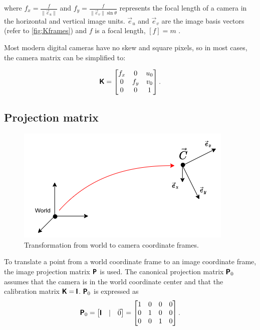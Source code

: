 where $f_x = \frac{f}{\lVert \vec{e}_u \rVert} $ and $f_y = \frac{f}{\lVert \vec{e}_v \rVert \sin{\theta}}$ represents the focal length of a camera in the horizontal and vertical image units.
$\vec{e}_u$ and $\vec{e}_v$ are the image basis vectors (refer to \autoref{fig:Kframes}) and $f$ is a focal length, $[f] = m$ .

Most modern digital cameras have no skew and square pixels, so in most cases, the camera matrix can be simplified to:

\begin{equation}
    \label{eq:kmat}
    \pmb{\mathsf{K}} = \begin{bmatrix}
        f_x & 0 & u_0 \\
        0 & f_y & v_0 \\
        0 & 0 & 1 \\
    \end{bmatrix}.
\end{equation}

\subsection{Projection matrix}

\begin{figure}[ht]
    \centering
    \includegraphics[width=.5\textwidth]{graphics/frames.png}
    \caption{Transformation from world to camera coordinate frames.}
    \label{fig:frames}
\end{figure}

To translate a point from a world coordinate frame to an image coordinate frame, the image projection matrix $\pmb{\mathsf{P}}$ is used. 
The canonical projection matrix $\pmb{\mathsf{P}}_0$ assumes that the camera is in the world coordinate center and that the calibration matrix $\pmb{\mathsf{K}} = \pmb{\mathsf{I}}$.
$\pmb{\mathsf{P}}_0$ is expressed as
\begin{equation}
\pmb{\mathsf{P}}_0 = \begin{bmatrix} \pmb{\mathsf{I}} & | & \vec{0} \end{bmatrix} = 
    \begin{bmatrix}
    1 & 0 & 0 & 0 \\
    0 & 1 & 0 & 0 \\
    0 & 0 & 1 & 0 \\
    \end{bmatrix}.
\end{equation}

